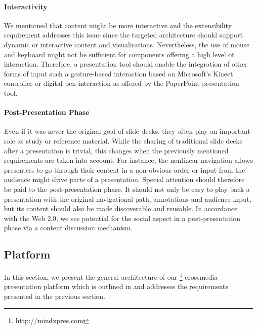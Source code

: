      \paragraph{Interactivity} We mentioned that content might be more
      interactive and the extensibility requirement addresses this issue since
      the targeted architecture should support dynamic or interactive content
      and visualisations. Nevertheless, the use of mouse and keyboard might not
      be sufficient for components offering a high level of interaction.
      Therefore, a presentation tool should enable the integration of other
      forms of input such a gesture-based interaction based on Microsoft's
      Kinect controller or digital pen interaction \citep{signer-2} as offered
      by the PaperPoint \citep{signer-1} presentation tool.

     \paragraph{Post-Presentation Phase} Even if it was never the original goal
      of slide decks, they often play an important role as study or reference
      material. While the sharing of traditional slide decks after a
      presentation is trivial, this changes when the previously mentioned
      requirements are taken into account. For instance, the nonlinear
      navigation allows presenters to go through their content in a non-obvious
      order or input from the audience might drive parts of a presentation.
      Special attention should therefore be paid to the post-presentation
      phase. It should not only be easy to play back a presentation with the
      original navigational path, annotations and audience input, but its
      content should also be made discoverable and reusable. In accordance with
      the Web 2.0, we see potential for the social aspect in a
      post-presentation phase via a content discussion mechanism.

   \subsection{\mxp Platform}
    \label{mxp-platform}

    In this section, we present the general architecture of our
    \mxp\footnote{http://mindxpres.com} crossmedia presentation platform which
    is outlined in  and addresses the requirements
    presented in the previous section.


